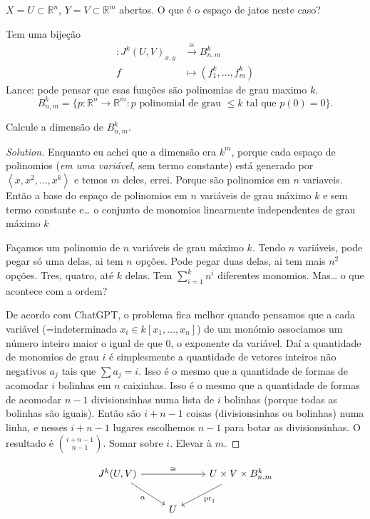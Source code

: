 \begin{example}\leavevmode
\(X=U \subset \mathbb{R}^n\), \(Y= V \subset \mathbb{R}^m\) abertos. O que é o espaço de jatos neste caso?

Tem uma bijeção 
\begin{align*}
	: J^k(U,V)_{x,y} &\xrightarrow{\cong}B_{n,m}^k \\
	f &\longmapsto (f_1^k,\ldots,f_m^k)
\end{align*}
Lance: pode pensar que esas funções são polinomias de grau maximo $k$.
\[B^k_{n,m}=\{p: \mathbb{R}^n\to \mathbb{R}^m: p \text{ polinomial de grau \(\leq k\) tal que \(p(0)=0\)} \}.\]

\begin{exercise}\leavevmode
Calcule a dimensão de \(B^k_{n,m}\).
\end{exercise}

\begin{proof}[Solution]\leavevmode
Enquanto eu achei que a dimensão era \(k^m\), porque cada espaço de polinomios (\textit{em uma variável}, sem termo constante) está generado por \(\left<x,x^2,\ldots,x^k\right>\) e temos $m$ deles, errei. Porque são polinomios em $n$ variaveis. Então a base do espaço de polinomios em $n$ variáveis de grau máximo \(k\) e sem termo constante e… o conjunto de monomios linearmente independentes de grau máximo \(k\)

Façamos um polinomio de $n$ variáveis de grau máximo \(k\). Tendo $n$ variáveis, pode pegar só uma delas, ai tem $n$ opções. Pode pegar duas delas, ai tem mais \(n^2\) opções. Tres, quatro, até \(k\) delas. Tem \(\sum_{i=1}^k n^i\) diferentes monomios. {\color{2}Mas…} o que acontece com a ordem?

De acordo com ChatGPT, o problema fica melhor quando pensamos que a cada variável (=indeterminada \(x_i \in k[x_1,\ldots,x_n]\)) de um monómio associamos um número inteiro maior o igual de que 0, o exponente da variável. Daí a quantidade de monomios de grau \(i\) é simplesmente a quantidade de vetores inteiros não negativos \(a_j\) tais que \(\sum a_j=i\). Isso é o mesmo que a quantidade de formas de acomodar \(i\) bolinhas em $n$ caixinhas. Isso é o mesmo que a quantidade de formas de acomodar \(n-1\) divisionsinhas numa lista de \(i\) bolinhas (porque todas as bolinhas são iguais). Então são \(i + n-1\) coisas (divisionsinhas ou bolinhas) numa linha, e nesses \(i + n-1 \) lugares escolhemos \(n-1\) para botar as divisionsinhas. O resultado é \(\binom{i+n-1}{n-1}\). Somar sobre \(i\). Elevar à $m$.
\end{proof}
\[\begin{tikzcd}
J^k(U,V)\arrow[rr,"\cong"]\arrow[dr,"\alpha",swap]&&U \times V \times B^k_{n,m}\arrow[dl,"\operatorname{pr}_1"]\\
&U
\end{tikzcd}\]



\end{example}
